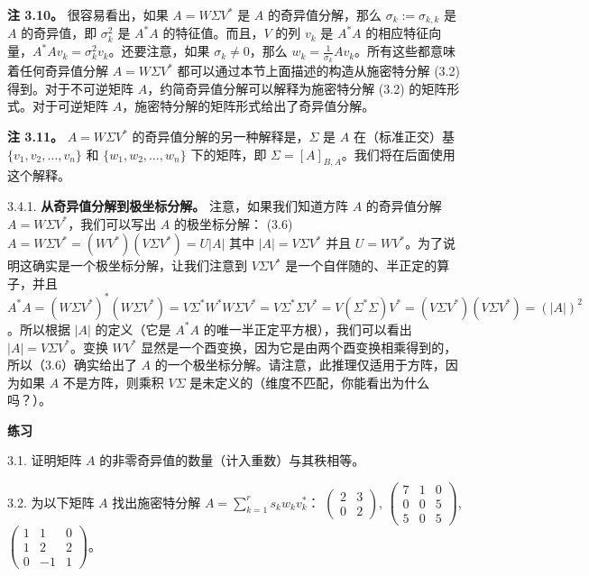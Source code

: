 \textbf{注 3.10。} 很容易看出，如果 $A = W \Sigma V^*$ 是 $A$ 的奇异值分解，那么 $\sigma_k := \sigma_{k,k}$ 是 $A$ 的奇异值，即 $\sigma_k^2$ 是 $A^*A$ 的特征值。而且，$V$ 的列 $v_k$ 是 $A^*A$ 的相应特征向量，$A^*Av_k = \sigma_k^2 v_k$。还要注意，如果 $\sigma_k \neq 0$，那么 $w_k = \frac{1}{\sigma_k} Av_k$。所有这些都意味着任何奇异值分解 $A = W \Sigma V^*$ 都可以通过本节上面描述的构造从施密特分解 (3.2) 得到。对于不可逆矩阵 $A$，约简奇异值分解可以解释为施密特分解 (3.2) 的矩阵形式。对于可逆矩阵 $A$，施密特分解的矩阵形式给出了奇异值分解。

\textbf{注 3.11。} $A = W \Sigma V^*$ 的奇异值分解的另一种解释是，$\Sigma$ 是 $A$ 在（标准正交）基 $\{v_1, v_2, \dots, v_n\}$ 和 $\{w_1, w_2, \dots, w_n\}$ 下的矩阵，即 $\Sigma = [A]_{B,A}$。我们将在后面使用这个解释。

3.4.1. \textbf{从奇异值分解到极坐标分解。} 注意，如果我们知道方阵 $A$ 的奇异值分解 $A = W \Sigma V^*$，我们可以写出 $A$ 的极坐标分解：
(3.6) $A = W \Sigma V^* = (WV^*) (V \Sigma V^*) = U|A|$
其中 $|A| = V \Sigma V^*$ 并且 $U = WV^*$。为了说明这确实是一个极坐标分解，让我们注意到 $V\Sigma V^*$ 是一个自伴随的、半正定的算子，并且 $A^*A = (W\Sigma V^*)^*(W\Sigma V^*) = V \Sigma^* W^* W \Sigma V^* = V \Sigma^*\Sigma V^* = V (\Sigma^* \Sigma) V^* = (V \Sigma V^*)(V \Sigma V^*) = (|A|)^2$。所以根据 $|A|$ 的定义（它是 $A^*A$ 的唯一半正定平方根），我们可以看出 $|A| = V \Sigma V^*$。变换 $WV^*$ 显然是一个酉变换，因为它是由两个酉变换相乘得到的，所以（3.6）确实给出了 $A$ 的一个极坐标分解。请注意，此推理仅适用于方阵，因为如果 $A$ 不是方阵，则乘积 $V\Sigma$ 是未定义的（维度不匹配，你能看出为什么吗？）。

\textbf{练习}~

3.1. 证明矩阵 $A$ 的非零奇异值的数量（计入重数）与其秩相等。





3.2. 为以下矩阵 $A$ 找出施密特分解 $A = \sum_{k=1}^r s_k w_k v_k^*$：
$\begin{pmatrix} 2 & 3 \\ 0 & 2 \end{pmatrix}$, $\begin{pmatrix} 7 & 1 & 0 \\ 0 & 0 & 5 \\ 5 & 0 & 5 \end{pmatrix}$, $\begin{pmatrix} 1 & 1 & 0 \\ 1 & 2 & 2 \\ 0 & -1 & 1 \end{pmatrix}$。

